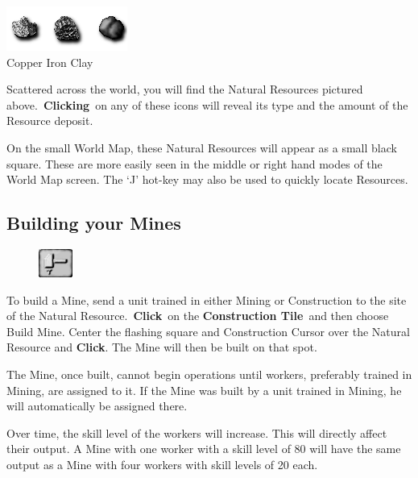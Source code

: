 \begin{center}
\includegraphics[width=0.5\linewidth]{Iresources}
\\ Copper Iron Clay
\end{center}

Scattered across the world, you will find the Natural Resources pictured above. \textbf{Clicking} on any of these icons will reveal its type and the amount of the Resource deposit.

On the small World Map, these Natural Resources will appear as a small black square. These are more easily seen in the middle or right hand modes of the World Map screen. The ‘J’ hot-key may also be used to quickly locate Resources.

\subsection{Building your Mines}


\begin{figure}
	\vspace{-20pt}
	\begin{center}
		\includegraphics[width=0.1\textwidth]{Thammer}
	\end{center}
	\vspace{-20pt}
\end{figure}

To build a Mine, send a unit trained in either Mining or Construction to the site of the Natural Resource. \textbf{Click} on the \textbf{Construction Tile} and then choose Build Mine. Center the flashing square and Construction Cursor over the Natural Resource and \textbf{Click}. The Mine will then be built on that spot.

The Mine, once built, cannot begin operations until workers, preferably trained in Mining, are assigned to it. If the Mine was built by a unit trained in Mining, he will automatically be assigned there.

Over time, the skill level of the workers will increase. This will directly affect their output. A Mine with one worker with a skill level of 80 will have the same output as a Mine with four workers with skill levels of 20 each.

